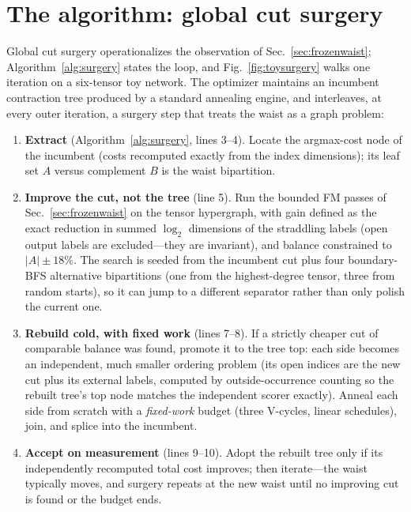 \documentclass{SciPost}
\begin{document}
\section{The algorithm: global cut surgery}
\label{sec:algorithm}

Global cut surgery operationalizes the observation of
Sec.~\ref{sec:frozenwaist}; Algorithm~\ref{alg:surgery} states the loop,
and Fig.~\ref{fig:toysurgery} walks one iteration on a six-tensor toy
network. The optimizer maintains an incumbent
contraction tree produced by a standard annealing engine, and
interleaves, at every outer iteration, a surgery step that treats the
waist as a graph problem:

\begin{enumerate}
\item \textbf{Extract} (Algorithm~\ref{alg:surgery}, lines 3--4).
  Locate the argmax-cost node of the incumbent
  (costs recomputed exactly from the index dimensions); its leaf set
  $A$ versus complement $B$ is the waist bipartition.
\item \textbf{Improve the cut, not the tree} (line 5). Run the bounded
  FM passes of Sec.~\ref{sec:frozenwaist} on the tensor hypergraph,
  with gain
  defined as the exact reduction in summed $\log_2$ dimensions of the
  straddling labels (open output labels are excluded---they are
  invariant), and balance constrained to $|A| \pm 18\%$. The search is
  seeded from the incumbent cut plus four boundary-BFS alternative
  bipartitions (one from the highest-degree tensor, three from random
  starts), so it can jump to a different separator rather than only
  polish the current one.
\item \textbf{Rebuild cold, with fixed work} (lines 7--8). If a
  strictly cheaper cut
  of comparable balance was found, promote it to the tree top: each side
  becomes an independent, much smaller ordering problem (its open
  indices are the new cut plus its external labels, computed by
  outside-occurrence counting so the rebuilt tree's top node matches the
  independent scorer exactly). Anneal each side from scratch with a
  \emph{fixed-work} budget (three V-cycles, linear schedules), join, and
  splice into the incumbent.
\item \textbf{Accept on measurement} (lines 9--10). Adopt the rebuilt
  tree only if its
  independently recomputed total cost improves; then iterate---the waist
  typically moves, and surgery repeats at the new waist until no
  improving cut is found or the budget ends.
\end{enumerate}
\end{document}
